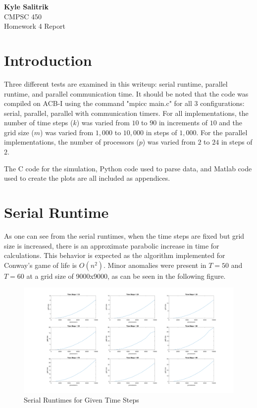 \documentclass[a4paper, 11pt]{article}
\begin{document}
\graphicspath{{./figures/}}
\noindent
\large\textbf{Kyle Salitrik} \\
\normalsize CMPSC 450\\
\large{Homework 4 Report} \hfill 

\section*{Introduction}
Three different tests are examined in this writeup: serial runtime, parallel runtime, and parallel communication time. It should be noted that the code was compiled on ACB-I using the command "mpicc main.c" for all 3 configurations: serial, parallel, parallel with communication timers. For all implementations, the number of time steps ($k$) was varied from $10$ to $90$ in increments of $10$ and the grid size ($m$) was varied from $1,000$ to $10,000$ in steps of $1,000$. For the parallel implementations, the number of processors ($p$) was varied from $2$ to $24$ in steps of $2$.

The C code for the simulation, Python code used to parse data, and Matlab code used to create the plots are all included as appendices.


\section*{Serial Runtime}
As one can see from the serial runtimes, when the time steps are fixed but grid size is increased, there is an approximate parabolic increase in time for calculations. This behavior is expected as the algorithm implemented for Conway's game of life is $O(n^2)$. Minor anomalies were present in $T=50$ and $T=60$ at a grid size of 9000x9000, as can be seen in the following figure.

\begin{figure}[H]
	\centering
	\centerline{\includegraphics[width=7.5in]{serial_time.png}}
	\caption{Serial Runtimes for Given Time Steps}
\end{figure}
\end{document}
